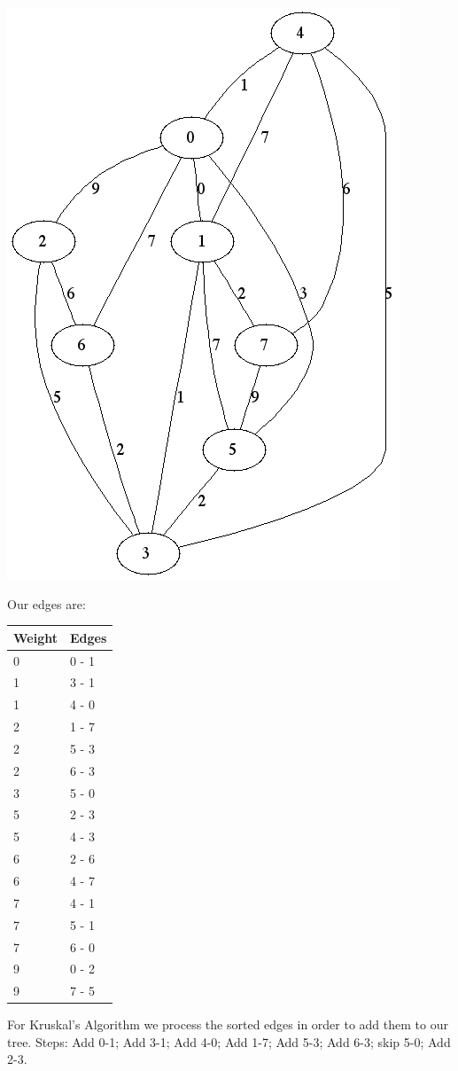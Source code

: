 \documentclass[12pt]{chmullighw}
\begin{document}
\begin{enumerate}
\begin{enumerate}
\begin{minipage}{0.65\linewidth}
\includegraphics[width=0.6\linewidth]{q6.png}
\end{minipage}
\begin{minipage}{0.2\linewidth}
Our edges are: \\
\begin{tabular}{l | l}
Weight & Edges \\
\hline
0 & 0 - 1 \\
1 & 3 - 1 \\
1 & 4 - 0 \\
2 & 1 - 7 \\
2 & 5 - 3 \\
2 & 6 - 3 \\
3 & 5 - 0 \\
5 & 2 - 3 \\
5 & 4 - 3 \\
6 & 2 - 6 \\
6 & 4 - 7 \\
7 & 4 - 1 \\
7 & 5 - 1 \\
7 & 6 - 0 \\
9 & 0 - 2 \\
9 & 7 - 5 \\
\end{tabular}
\end{minipage}

For Kruskal's Algorithm we process the sorted edges in order to add them to our
tree. Steps: Add 0-1; Add 3-1; Add 4-0; Add 1-7; Add 5-3; Add 6-3; skip 5-0; Add 2-3.


\end{enumerate}
\end{enumerate}
\end{document}
